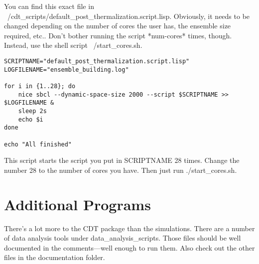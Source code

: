 \documentclass{article}
\begin{document}
You can find this exact file in
~/cdt\_scripts/default\_post\_thermalization.script.lisp. Obviously, it
needs to be changed depending on the number of cores the user has, the
ensemble size required, etc.. Don't bother running the script
*num-cores* times, though. Instead, use the shell script ~/start\_cores.sh.

\begin{lstlisting}
SCRIPTNAME="default_post_thermalization.script.lisp"
LOGFILENAME="ensemble_building.log"

for i in {1..28}; do 
    nice sbcl --dynamic-space-size 2000 --script $SCRIPTNAME >> $LOGFILENAME &
    sleep 2s
    echo $i
done

echo "All finished"

\end{lstlisting}
This script starts the script you put in SCRIPTNAME 28 times. Change
the number 28 to the number of cores you have. Then just run
./start\_cores.sh.

\section{Additional Programs}

There's a lot more to the CDT package than the simulations. There are
a number of data analysis tools under data\_analysis\_scripts. Those
files should be well documented in the comments---well enough to run
them. Also check out the other files in the documentation folder.
\end{document}

